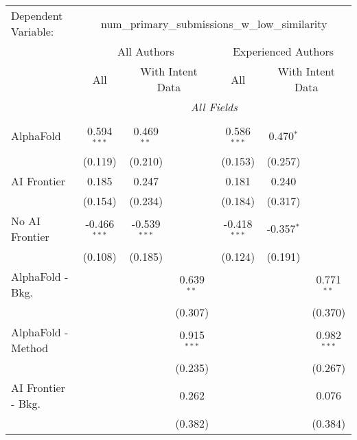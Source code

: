 \begingroup
\centering
\begin{tabular}{lcccccc}
   \tabularnewline \midrule \midrule
   Dependent Variable: & \multicolumn{6}{c}{num\_primary\_submissions\_w\_low\_similarity}\\
 & \multicolumn{3}{c}{All Authors} & \multicolumn{3}{c}{Experienced Authors} \\
\cmidrule(lr){2-4} \cmidrule(lr){5-7}
 & \multicolumn{1}{c}{All} & \multicolumn{2}{c}{With Intent Data} & \multicolumn{1}{c}{All} & \multicolumn{2}{c}{With Intent Data} \\
\cmidrule(lr){2-2} \cmidrule(lr){3-4} \cmidrule(lr){5-5} \cmidrule(lr){6-7}
 & \multicolumn{6}{c}{\textit{All Fields}} \\ \\
   AlphaFold               & 0.594$^{***}$  & 0.469$^{**}$   &               & 0.586$^{***}$  & 0.470$^{*}$  &   \\   
                           & (0.119)        & (0.210)        &               & (0.153)        & (0.257)      &   \\   
   AI Frontier             & 0.185          & 0.247          &               & 0.181          & 0.240        &   \\   
                           & (0.154)        & (0.234)        &               & (0.184)        & (0.317)      &   \\   
   No AI Frontier          & -0.466$^{***}$ & -0.539$^{***}$ &               & -0.418$^{***}$ & -0.357$^{*}$ &   \\   
                           & (0.108)        & (0.185)        &               & (0.124)        & (0.191)      &   \\   
   AlphaFold - Bkg.        &                &                & 0.639$^{**}$  &                &              & 0.771$^{**}$\\   
                           &                &                & (0.307)       &                &              & (0.370)\\   
   AlphaFold - Method      &                &                & 0.915$^{***}$ &                &              & 0.982$^{***}$\\   
                           &                &                & (0.235)       &                &              & (0.267)\\   
   AI Frontier - Bkg.      &                &                & 0.262         &                &              & 0.076\\   
                           &                &                & (0.382)       &                &              & (0.384)\\   

\end{tabular}
